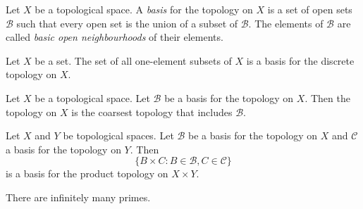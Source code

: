 \begin{df}[Basis]
Let $X$ be a topological space. A \emph{basis} for the topology on $X$ is a set of open sets $\mathcal{B}$ such that every open set is the union of a subset of $\mathcal{B}$. The elements of $\mathcal{B}$ are called \emph{basic open neighbourhoods} of their elements.
\end{df}

\begin{prop}
Let $X$ be a set. The set of all one-element subsets of $X$ is a basis for the discrete topology on $X$.
\end{prop}

\begin{prop}
Let $X$ be a topological space.
Let $\mathcal{B}$ be a basis for the topology on $X$.
Then the topology on $X$ is the coarsest topology that includes $\mathcal{B}$.
\end{prop}

\begin{prop}
Let $X$ and $Y$ be topological spaces. Let $\mathcal{B}$ be a basis for the topology on $X$ and $\mathcal{C}$ a basis for the topology on $Y$. Then
\[ \{ B \times C : B \in \mathcal{B}, C \in \mathcal{C} \} \]
is a basis for the product topology on $X \times Y$.
\end{prop}

\begin{thm}
There are infinitely many primes.
\end{thm}

